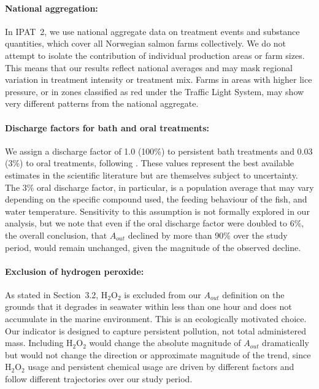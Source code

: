 \documentclass[12pt, a4paper]{report}
\begin{document}
\paragraph{National aggregation:}
In IPAT~2, we use national aggregate data on treatment events and
substance quantities, which cover all Norwegian salmon farms collectively.
We do not attempt to isolate the contribution of individual production
areas or farm sizes. This means that our results reflect national
averages and may mask regional variation in treatment intensity or
treatment mix. Farms in areas with higher lice pressure, or in zones
classified as red under the Traffic Light System, may show very different
patterns from the national aggregate.

\paragraph{Discharge factors for bath and oral treatments:}
We assign a discharge factor of 1.0 (100\%) to persistent bath treatments
and 0.03 (3\%) to oral treatments, following \citet{myhrjensen2020}.
These values represent the best available estimates in the scientific
literature but are themselves subject to uncertainty. The 3\% oral
discharge factor, in particular, is a population average that may vary
depending on the specific compound used, the feeding behaviour of the
fish, and water temperature. Sensitivity to this assumption is not
formally explored in our analysis, but we note that even if the oral
discharge factor were doubled to 6\%, the overall conclusion, that
$A_{out}$ declined by more than 90\% over the study period, would
remain unchanged, given the magnitude of the observed decline.

\paragraph{Exclusion of hydrogen peroxide:}
As stated in Section~3.2, H$_2$O$_2$ is excluded from our $A_{out}$
definition on the grounds that it degrades in seawater within less than
one hour and does not accumulate in the marine environment. This is an
ecologically motivated choice. Our indicator is designed to capture
persistent pollution, not total administered mass. Including H$_2$O$_2$
would change the absolute magnitude of $A_{out}$ dramatically but would
not change the direction or approximate magnitude of the trend, since
H$_2$O$_2$ usage and persistent chemical usage are driven by different
factors and follow different trajectories over our study period.
\end{document}
